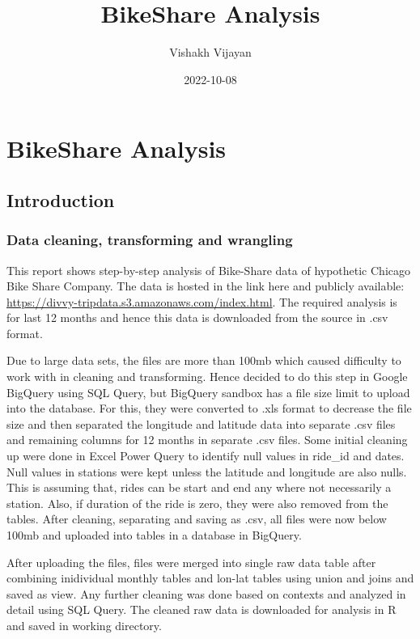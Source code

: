 \documentclass[
]{article}
\title{BikeShare Analysis}
\author{Vishakh Vijayan}
\date{2022-10-08}
\begin{document}
\maketitle

\hypertarget{bikeshare-analysis}{%
\section{BikeShare Analysis}\label{bikeshare-analysis}}

\hypertarget{introduction}{%
\subsection{Introduction}\label{introduction}}

\hypertarget{data-cleaning-transforming-and-wrangling}{%
\subsubsection{Data cleaning, transforming and
wrangling}\label{data-cleaning-transforming-and-wrangling}}

This report shows step-by-step analysis of Bike-Share data of hypothetic
Chicago Bike Share Company. The data is hosted in the link here and
publicly available:
\url{https://divvy-tripdata.s3.amazonaws.com/index.html}. The required
analysis is for last 12 months and hence this data is downloaded from
the source in .csv format.

Due to large data sets, the files are more than 100mb which caused
difficulty to work with in cleaning and transforming. Hence decided to
do this step in Google BigQuery using SQL Query, but BigQuery sandbox
has a file size limit to upload into the database. For this, they were
converted to .xls format to decrease the file size and then separated
the longitude and latitude data into separate .csv files and remaining
columns for 12 months in separate .csv files. Some initial cleaning up
were done in Excel Power Query to identify null values in ride\_id and
dates. Null values in stations were kept unless the latitude and
longitude are also nulls. This is assuming that, rides can be start and
end any where not necessarily a station. Also, if duration of the ride
is zero, they were also removed from the tables. After cleaning,
separating and saving as .csv, all files were now below 100mb and
uploaded into tables in a database in BigQuery.

After uploading the files, files were merged into single raw data table
after combining inidividual monthly tables and lon-lat tables using
union and joins and saved as view. Any further cleaning was done based
on contexts and analyzed in detail using SQL Query. The cleaned raw data
is downloaded for analysis in R and saved in working directory.
\end{document}
